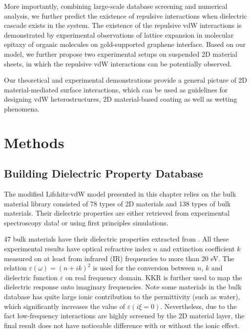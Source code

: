 More importantly, combining large-scale database screening and
numerical analysis, we further predict the existence of repulsive
interactions when dielectric cascade exists in the system. The
existence of the repulsive vdW interactions is demonstrated by
experimental observations of lattice expansion in molecular epitaxy of
organic molecules on gold-supported graphene interface.
%
Based on our model, we further propose two experimental setups on
suspended 2D material sheets, in which the repulsive vdW interactions
can be potentially observed.

Our theoretical and experimental demonstrations provide a general
picture of 2D material-mediated surface interactions, which can be
used as guidelines for designing vdW heterostructures, 2D
material-based coating as well as wetting phenomena.


\section{Methods}
\label{sec:vdw-methods}

\subsection*{Building Dielectric Property Database}
\label{sec:retr-exper-diel}

The modified Lifshitz-vdW model presented in this chapter relies on
the bulk material library consisted of 78 types of 2D materials and
138 types of bulk materials. Their dielectric properties are either
retrieved from experimental spectroscopy
data!\cite{Palik_1998_handbook} or using first principles simulations.

47 bulk materials have their dielectric properties extracted from
\parencite{Palik_1998_handbook}.
%
All these experimental results have optical refractive index $n$ and
extinction coefficient $k$ measured on at least from infrared (IR)
frequencies to more than 20 eV.
%
The relation $\varepsilon(\omega) = (n + ik)^{2}$ is used for the
conversion between $n$, $k$ and dielectric function $\varepsilon$ on
real frequency domain. KKR is further used to map the dielectric response onto imaginary frequencies.
%
Note some materials in the bulk database has quite large ionic
contribution to the permittivity (such as water), which significantly
increases the value of $\varepsilon(i \xi = 0)$. Nevertheless, due to
the fact low-frequency interactions are highly screened by the 2D
material layer, the final result does not have noticeable difference
with or without the ionic effect.

